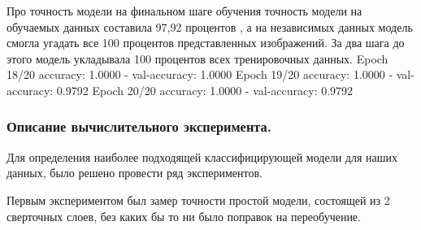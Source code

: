 Про точность модели 
на финальном шаге обучения точность модели на обучаемых данных составила 97,92 процентов , а на независимых данных модель смогла угадать все 100 процентов представленных изображений. 
За два шага до этого модель укладывала 100 процентов всех тренировочных данных. \newline
Epoch 18/20 \newline
accuracy: 1.0000 - val-accuracy: 1.0000 \newline
Epoch 19/20\newline
accuracy: 1.0000 - val-accuracy: 0.9792\newline
Epoch 20/20\newline
accuracy: 1.0000 - val-accuracy: 0.9792\newline
\begin{figure}[H]
\end{figure}
\subsubsection{Описание вычислительного эксперимента.}

Для определения наиболее подходящей классифицирующей модели для наших данных, было решено провести ряд экспериментов.

Первым экспериментом был замер точности простой модели, состоящей из 2 сверточных слоев, без каких бы то ни было поправок на переобучение.

